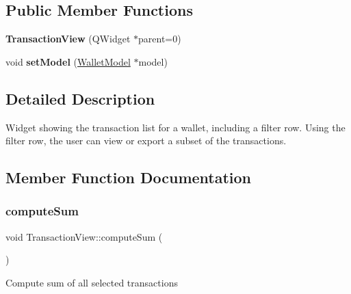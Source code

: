 \subsection*{Public Member Functions}
\begin{DoxyCompactItemize}
\item 
\mbox{\label{class_transaction_view_a0c5e8b90206b4e8b8bf68dd7e319798f}} 
{\bfseries Transaction\+View} (Q\+Widget $\ast$parent=0)
\item 
\mbox{\label{class_transaction_view_a4920c2cd57d72eb50248948fa160c83c}} 
void {\bfseries set\+Model} (\mbox{\hyperlink{class_wallet_model}{Wallet\+Model}} $\ast$model)
\end{DoxyCompactItemize}


\subsection{Detailed Description}
Widget showing the transaction list for a wallet, including a filter row. Using the filter row, the user can view or export a subset of the transactions. 

\subsection{Member Function Documentation}
\mbox{\label{class_transaction_view_abb2ea48a61bb12a0dda9d63952adc50e}} 
\subsubsection{\texorpdfstring{computeSum}{computeSum}}
{\footnotesize\ttfamily void Transaction\+View\+::compute\+Sum (\begin{DoxyParamCaption}{ }\end{DoxyParamCaption})\hspace{0.3cm}{\ttfamily [slot]}}

Compute sum of all selected transactions \mbox{\label{class_transaction_view_a56d909951088cfc74b8b18fc2693e3b1}} 
